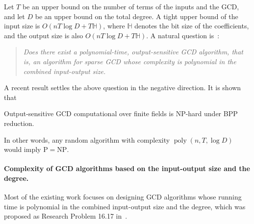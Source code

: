 \documentclass{article}
\numberwithin{equation}{section}
\begin{document}
Let $T$ be an upper bound on the number of terms of the inputs and the GCD, and let $D$ be an upper bound on the total degree. A tight upper bound of the input size is $O(n T \log D + T \mathbb{H})$, where $\mathbb{H}$ denotes the bit size of the coefficients, and the output size is also $O(n T \log D + T \mathbb{H})$.
A natural question is~\citep[Challenge 5]{SparsityChallenges}: 

\begin{quote}
\emph{Does there exist a polynomial-time, output-sensitive GCD algorithm, that is, an algorithm for sparse GCD whose complexity is polynomial in the combined input-output size.}
\end{quote}

A recent result \cite{Qiu2026OutputSensitive} settles the above question in the negative direction. It is shown that

\begin{theorem}
\label{th-gcdnph}
Output-sensitive GCD computational over finite fields is NP-hard under BPP reduction.
\end{theorem}

In other words, any random algorithm with complexity $\operatorname{poly}(n, T, \log D)$ would imply $\mathrm{P} = \mathrm{NP}$. 

\paragraph{Complexity of GCD algorithms based on the input-output size and the degree.}

Most of the existing work focuses on designing GCD algorithms whose running time is polynomial in the combined input-output size and the degree, which was proposed as  Research Problem 16.17 in~\cite{vonzurGathen2013}.
\end{document}
